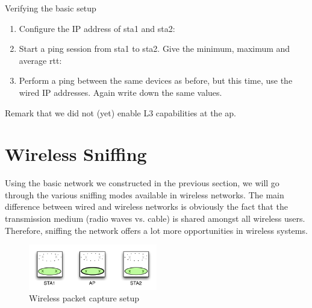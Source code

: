 \begin{exercise}{Verifying the basic setup}\label{ex:pingtest}
	
	\begin{enumerate}
		\item Configure the IP address of \ac{sta}1 and \ac{sta}2:\newline
		\item Start a ping session from \ac{sta}1 to \ac{sta}2. Give the minimum, maximum and average \ac{rtt}:\newline
		\begin{esolution}
		\end{esolution}
		\item Perform a ping between the same devices as before, but this time, use the wired IP addresses. Again write down the same values.\newline
		\begin{esolution}
		\end{esolution}
	\end{enumerate}
\end{exercise}

\remark Remark that we did not (yet) enable L3 capabilities at the \ac{ap}.


\section{Wireless Sniffing}

Using the basic network we constructed in the previous section, we will go through the various sniffing modes available in wireless networks. The main difference between wired and wireless networks is obviously the fact that the transmission medium (radio waves vs. cable) is shared amongst all wireless users. Therefore, sniffing the network offers a lot more opportunities in wireless systems.
\begin{figure}
	\begin{center}
		\includegraphics[width=0.5\textwidth]{images/snif1.pdf} 
		\caption{Wireless packet capture setup} 
		\label{fig:snif1} 
	\end{center}
\end{figure}


